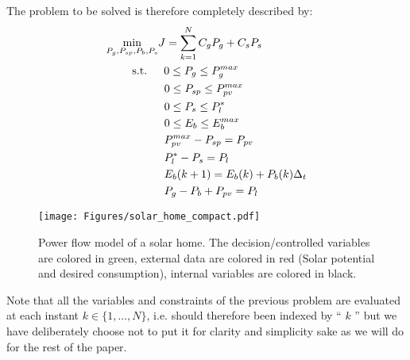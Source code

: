 \documentclass[conference]{IEEEtran}
\begin{document}
The problem to be solved is therefore completely  described by:
\begin{subequations}
    \begin{align} 
        & \underset{P_g,P_{sp},P_b,P_s}{\text{min}} J = \sum_{k=1}^{N} C_gP_g + C_sP_s \label{eq:cost2min}\\
        & \text{\hspace{20px} s.t.\hspace{15px}} 0 \leq P_g\leq P_g^{max} \label{eq:Pgr_cons} \\
        & \hspace{52px} 0 \leq P_{sp} \leq P_{pv}^{max} \label{eq:Pcu_cons}\\
        & \hspace{52px} 0 \leq P_s \leq P_l^* \label{eq:Psh_cons} \\
        & \hspace{52px} 0 \leq E_b \leq E_b^{max} \label{eq:Est_cons} \\
        & \hspace{52px} P_{pv}^{max}-P_{sp} = P_{pv} \label{eq:P_pv} \\
        & \hspace{52px} P_l^* - P_s =  P_l\label{eq:P_l} \\
        & \hspace{52px} E_b(k+1) = E_b(k) + P_b(k)\Delta_t \label{eq:Est_dyn}  \\
        & \hspace{52px} P_g- P_b + {P_{pv}} = P_l \label{eq:Engy_csvt} 
    \end{align}
\end{subequations}

\begin{figure}[!t]

    \begin{center}
                \texttt{[image: Figures/solar\_home\_compact.pdf]}
        \end{center}

        \caption{Power flow model of a solar home.
        The decision/controlled variables are colored in green, external data are colored in red (Solar potential and desired consumption), internal variables are colored in black.
        }
        \label{fig:solhome}
   
\end{figure}

Note that all the variables and constraints of the previous problem are evaluated at each instant $k \in \{1, \ldots, N \}$, i.e. should therefore been indexed by `` $k$ '' but we have deliberately choose not to  put it for clarity and simplicity sake as we will do for the rest of the paper.
\end{document}
